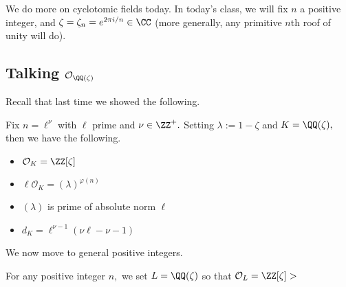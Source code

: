 













We do more on cyclotomic fields today. In today's class, we will fix $n$ a positive integer, and $\zeta=\zeta_n=e^{2\pi i/n}\in\CC$ (more generally, any primitive $n$th roof of unity will do).

\subsection{Talking \texorpdfstring{$\mathcal O_{\QQ(\zeta)}$}{}}
Recall that last time we showed the following.
\begin{proposition}
	Fix $n=\ell^\nu$ with $\ell$ prime and $\nu\in\ZZ^+.$ Setting $\lambda:=1-\zeta$ and $K=\QQ(\zeta),$ then we have the following.
	\begin{itemize}
		\item $\mathcal O_K=\ZZ[\zeta]$
		\item $\ell\mathcal O_K=(\lambda)^{\varphi(n)}$
		\item $(\lambda)$ is prime of absolute norm $\ell$
		\item $d_K=\ell^{\nu-1}(\nu\ell-\nu-1)$
	\end{itemize}
\end{proposition}
We now move to general positive integers.
\begin{proposition}
	For any positive integer $n,$ we set $L=\QQ(\zeta)$ so that $\mathcal O_L=\ZZ[\zeta]>$
\end{proposition}
